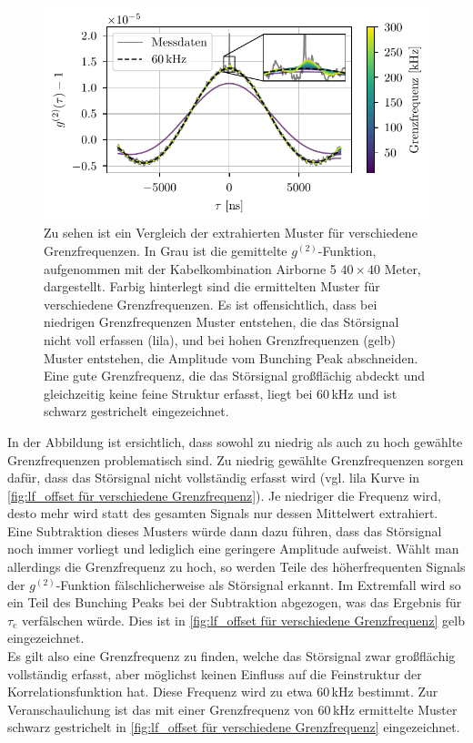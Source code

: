 \begin{figure}[h]
    \centering
    \includegraphics{images/Analysis/lf_offset.pdf}
    \caption{Zu sehen ist ein Vergleich der extrahierten Muster für verschiedene Grenzfrequenzen. In Grau ist die gemittelte $g^{(2)}$-Funktion, aufgenommen mit der Kabelkombination Airborne 5 $40\times 40$ Meter, dargestellt. Farbig hinterlegt sind die ermittelten Muster für verschiedene Grenzfrequenzen. Es ist offensichtlich, dass bei niedrigen Grenzfrequenzen Muster entstehen, die das Störsignal nicht voll erfassen (lila), und bei hohen Grenzfrequenzen (gelb) Muster entstehen, die Amplitude vom Bunching Peak abschneiden. Eine gute Grenzfrequenz, die das Störsignal großflächig abdeckt und gleichzeitig keine feine Struktur erfasst, liegt bei 60\,kHz und ist schwarz gestrichelt eingezeichnet.}
    \label{fig:lf_offset für verschiedene Grenzfrequenz}
\end{figure}
In der Abbildung ist ersichtlich, dass sowohl zu niedrig als auch zu hoch gewählte Grenzfrequenzen problematisch sind. 
Zu niedrig gewählte Grenzfrequenzen sorgen dafür, dass das Störsignal nicht vollständig erfasst wird (vgl. lila Kurve in \autoref{fig:lf_offset für verschiedene Grenzfrequenz}). 
Je niedriger die Frequenz wird, desto mehr wird statt des gesamten Signals nur dessen Mittelwert extrahiert. 
Eine Subtraktion dieses Musters würde dann dazu führen, dass das Störsignal noch immer vorliegt und lediglich eine geringere Amplitude aufweist. 
Wählt man allerdings die Grenzfrequenz zu hoch, so werden Teile des höherfrequenten Signals der $g^{(2)}$-Funktion fälschlicherweise als Störsignal erkannt. 
Im Extremfall wird so ein Teil des Bunching Peaks bei der Subtraktion abgezogen, was das Ergebnis für $\tau_{\mathrm{c}}$ verfälschen würde. 
Dies ist in \autoref{fig:lf_offset für verschiedene Grenzfrequenz} gelb eingezeichnet. \\
Es gilt also eine Grenzfrequenz zu finden, welche das Störsignal zwar großflächig vollständig erfasst, aber möglichst keinen Einfluss auf die Feinstruktur der Korrelationsfunktion hat. 
Diese Frequenz wird zu etwa 60\,kHz bestimmt. 
Zur Veranschaulichung ist das mit einer Grenzfrequenz von 60\,kHz ermittelte Muster schwarz gestrichelt in \autoref{fig:lf_offset für verschiedene Grenzfrequenz} eingezeichnet. \\

